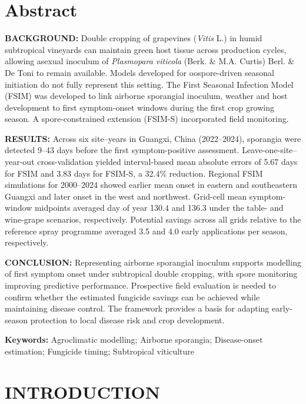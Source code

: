 \documentclass{article}
\begin{document}
\section*{Abstract}\label{abstract}

\textbf{BACKGROUND:} Double cropping of grapevines (\emph{Vitis} L.) in humid
subtropical vineyards can
maintain green host tissue across production cycles, allowing asexual
inoculum of \emph{Plasmopara viticola} (Berk. \& M.A. Curtis) Berl. \& De Toni
to remain available. Models developed
for oospore-driven seasonal initiation do not fully represent this setting.
The First Seasonal Infection Model (FSIM) was developed to link airborne
sporangial inoculum, weather and host development to first symptom-onset
windows during the first crop growing season. A spore-constrained extension
(FSIM-S) incorporated field monitoring.

\textbf{RESULTS:} Across six site--years in Guangxi, China (2022--2024),
sporangia were detected 9--43 days before the first symptom-positive
assessment. Leave-one-site--year-out cross-validation yielded
interval-based mean absolute errors of 5.67 days for FSIM and 3.83 days for
FSIM-S, a 32.4\% reduction. Regional FSIM simulations for 2000--2024 showed
earlier mean onset in eastern and southeastern Guangxi and later onset in
the west and northwest. Grid-cell mean symptom-window midpoints averaged
day of year 130.4 and 136.3 under the table- and wine-grape scenarios,
respectively. Potential savings across all grids relative to the reference
spray programme averaged 3.5 and 4.0 early applications per season,
respectively.

\textbf{CONCLUSION:} Representing airborne sporangial inoculum supports
modelling of first symptom onset under subtropical double cropping, with
spore monitoring improving predictive performance. Prospective field
evaluation is needed to confirm whether the estimated fungicide savings
can be achieved while maintaining disease control. The framework provides
a basis for adapting early-season protection to local disease risk and
crop development.

\textbf{Keywords:} Agroclimatic modelling; Airborne sporangia;
Disease-onset estimation; Fungicide timing; Subtropical viticulture

\section{INTRODUCTION}\label{introduction}
\end{document}
